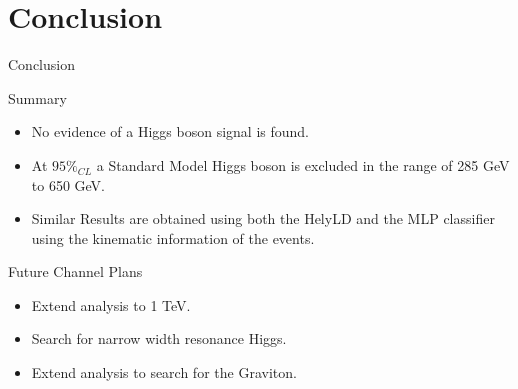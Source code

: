 \section{Conclusion}

\begin{frame}{Conclusion}
\begin{center}
Summary
\begin{itemize}
\item
  No evidence of a Higgs boson signal is found.
\item
  At $95\%_{CL}$ a Standard Model Higgs boson is excluded in the range of 285 GeV to 650 GeV.
\item
  Similar Results are obtained using both the HelyLD and the MLP classifier using the kinematic information of the events.
\end{itemize}

\vspace{2em}

Future Channel Plans
\begin{itemize}
\item
Extend analysis to 1 TeV.
\item
Search for narrow width resonance Higgs.
\item
Extend analysis to search for the Graviton.
\end{itemize}

\end{center}
\end{frame}
